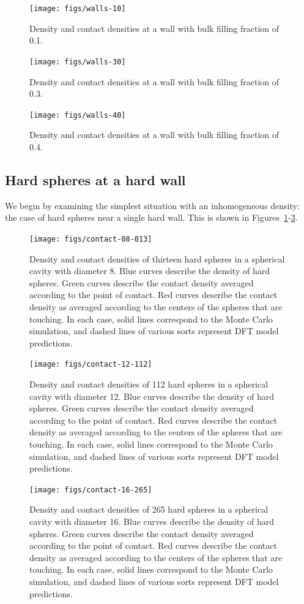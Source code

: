 \documentclass[letterpaper,twocolumn,amsmath,amssymb,jcp,10pt,aip]{revtex4-1}
\begin{document}
\begin{figure}
  \texttt{[image: figs/walls-10]}
  \caption{Density and contact densities at a wall with bulk filling
    fraction of 0.1.}
  \label{fig:walls-10}
\end{figure}

\begin{figure}
  \texttt{[image: figs/walls-30]}
  \caption{Density and contact densities at a wall with bulk filling
    fraction of 0.3.}
  \label{fig:walls-30}
\end{figure}

\begin{figure}
  \texttt{[image: figs/walls-40]}
  \caption{Density and contact densities at a wall with bulk filling
    fraction of 0.4.}
  \label{fig:walls-40}
\end{figure}

\subsection{Hard spheres at a hard wall}

We begin by examining the simplest situation with an inhomogeneous
density:  the case of hard spheres near a single hard wall.  This is
shown in Figures~\ref{fig:walls-10}-\ref{fig:walls-40}.



\newcommand\sphereExplanation{ Blue curves describe the density of
  hard spheres.  Green curves describe the contact density averaged
  according to the point of contact.  Red curves describe the contact
  density as averaged according to the centers of the spheres that are
  touching.  In each case, solid lines correspond to the Monte Carlo
  simulation, and dashed lines of various sorts represent DFT model
  predictions.  }

\begin{figure}
  \texttt{[image: figs/contact-08-013]}
  \caption{Density and contact densities of thirteen hard spheres in a
    spherical cavity with diameter 8. \sphereExplanation }
  \label{fig:sphere-8}
\end{figure}

\begin{figure}
  \texttt{[image: figs/contact-12-112]}
  \caption{Density and contact densities of 112 hard spheres in a
    spherical cavity with diameter 12.  \sphereExplanation}
  \label{fig:sphere-12}
\end{figure}

\begin{figure}
  \texttt{[image: figs/contact-16-265]}
  \caption{Density and contact densities of 265 hard spheres in a
    spherical cavity with diameter 16. \sphereExplanation}
  \label{fig:sphere-16}
\end{figure}
\end{document}
